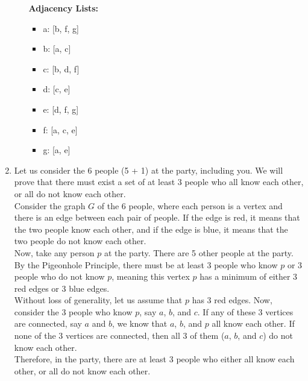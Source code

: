 \documentclass[a4paper]{article}
\begin{document}
\begin{enumerate}
\begin{enumerate}
        \textbf{Adjacency Lists:}
        \begin{itemize}
            \item a: [b, f, g]
            \item b: [a, c]
            \item c: [b, d, f]
            \item d: [c, e]
            \item e: [d, f, g]
            \item f: [a, c, e]
            \item g: [a, e]
        \end{itemize}
        \end{enumerate}

        \newpage
        \item Let us consider the 6 people (5 + 1) at the party, including you. We will prove that there must exist a set of at least 3 people who all know each other, or all do not know each other. \\
        
        Consider the graph $G$ of the 6 people, where each person is a vertex and there is an edge between each pair of people. If the edge is red, it means that the two people know each other, and if the edge is blue, it means that the two people do not know each other. \\

        Now, take any person $p$ at the party. There are 5 other people at the party. By the Pigeonhole Principle, there must be at least 3 people who know $p$ or 3 people who do not know $p$, meaning this vertex $p$ has a minimum of either 3 red edges or 3 blue edges. \\

        Without loss of generality, let us assume that $p$ has 3 red edges. Now, consider the 3 people who know $p$, say $a$, $b$, and $c$. If any of these 3 vertices are connected, say $a$ and $b$, we know that $a$, $b$, and $p$ all know each other. If none of the 3 vertices are connected, then all 3 of them ($a$, $b$, and $c$) do not know each other. \\

        Therefore, in the party, there are at least 3 people who either all know each other, or all do not know each other. \\
        

\end{enumerate}
\end{document}

